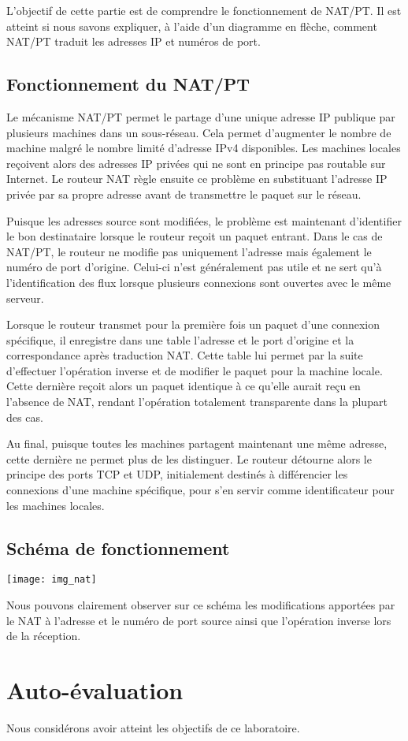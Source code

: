 \documentclass[11pt,a4paper]{article}
\begin{document}
L'objectif de cette partie est de comprendre le fonctionnement de NAT/PT. Il est atteint si nous savons expliquer, à l'aide d'un diagramme en flèche, comment NAT/PT traduit les adresses IP et numéros de port.

\subsection{Fonctionnement du NAT/PT}

Le mécanisme NAT/PT permet le partage d'une unique adresse IP publique par plusieurs machines dans un sous-réseau. Cela permet d'augmenter le nombre de machine malgré le nombre limité d'adresse IPv4 disponibles.
Les machines locales reçoivent alors des adresses IP privées qui ne sont en principe pas routable sur Internet. Le routeur NAT règle ensuite ce problème en substituant l'adresse IP privée par sa propre adresse avant de transmettre le paquet sur le réseau. 

Puisque les adresses source sont modifiées, le problème est maintenant d'identifier le bon destinataire lorsque le routeur reçoit un paquet entrant.
Dans le cas de NAT/PT, le routeur ne modifie pas uniquement l'adresse mais également le numéro de port d'origine. Celui-ci n'est généralement pas utile et ne sert qu'à l'identification des flux lorsque plusieurs connexions sont ouvertes avec le même serveur.

Lorsque le routeur transmet pour la première fois un paquet d'une connexion spécifique, il enregistre dans une table l'adresse et le port d'origine et la correspondance après traduction NAT. Cette table lui permet par la suite d'effectuer l'opération inverse et de modifier le paquet pour la machine locale. Cette dernière reçoit alors un paquet identique à ce qu'elle aurait reçu en l'absence de NAT, rendant l'opération totalement transparente dans la plupart des cas. 

Au final, puisque toutes les machines partagent maintenant une même adresse, cette dernière ne permet plus de les distinguer. Le routeur détourne alors le principe des ports TCP et UDP, initialement destinés à différencier les connexions d'une machine spécifique, pour s'en servir comme identificateur pour les machines locales.

\subsection{Schéma de fonctionnement}

\begin{center}
\texttt{[image: img\_nat]}
\end{center}

Nous pouvons clairement observer sur ce schéma les modifications apportées par le NAT à l'adresse et le numéro de port source ainsi que l'opération inverse lors de la réception.

\section{Auto-évaluation}

Nous considérons avoir atteint les objectifs de ce laboratoire.
\end{document}
